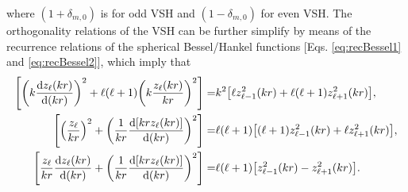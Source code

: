 %
where $(1+\delta_{m,0}) $ is for odd VSH and $(1-\delta_{m,0}) $ for even VSH. The orthogonality relations of the VSH can be further simplify by means of the recurrence relations of the spherical Bessel/Hankel functions [Eqs. \eqref{eq:recBessel1} and \eqref{eq:recBessel2}], which imply that
%
\begin{align}
\qty[\qty(k\dv{z_\ell(kr)}{(kr)})^2 + \ell(\ell+1)\qty(k\frac{z_\ell(kr)}{kr})^2] =& k^2
		\qty[\ell z_{\ell-1}^2(kr) + \ell(\ell+1)z_{\ell+1}^2(kr)],\\
\qty[\qty(\frac{ z_{\ell}}{kr})^2 + \qty(\frac{1}{kr}\dv{[kr z_\ell(kr)]}{(kr)})^2] =&
 	\ell(\ell+1)\qty[(\ell+1) z_{\ell-1}^2(kr)+ \ell z_{\ell+1}^2(kr)],  \\
\qty[\frac{ z_{\ell}}{kr}\dv{z_\ell(kr)}{(kr)} + \qty(\frac{1}{kr}\dv{[kr z_\ell(kr)]}{(kr)})^2] =&
	 	\ell(\ell+1)\qty[z_{\ell-1}^2(kr)- z_{\ell+1}^2(kr)].
\end{align}
%
